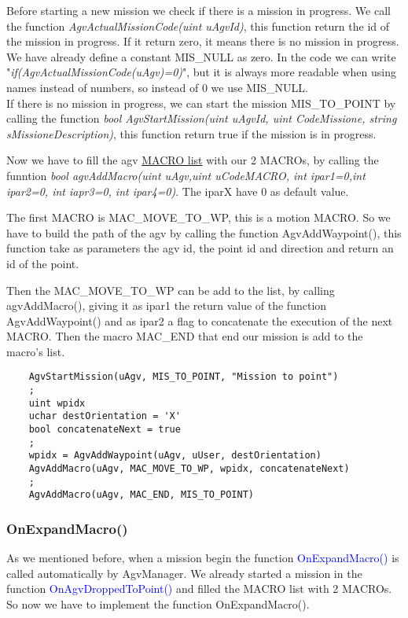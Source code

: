 Before starting a new mission we check if there is a mission in progress.
We call the function \textit{AgvActualMissionCode(uint uAgvId)}, this function return the id of the mission in progress.
If it return zero, it means there is no mission in progress. We have already define a constant MIS\_NULL as zero.
In the code we can write "\textit{if(AgvActualMissionCode(uAgv)=0)}", but it is always more readable when using names instead of numbers, so instead of 0 we use MIS\_NULL.\\

If there is no mission in progress, we can start the mission MIS\_TO\_POINT by calling the function \textit{bool AgvStartMission(uint uAgvId, uint CodeMissione, string sMissioneDescription)}, this function return true if the mission is in progress.

Now we have to fill the agv \underline{MACRO list} with our 2 MACROs, by calling the funntion \textit{bool agvAddMacro(uint uAgv,uint uCodeMACRO, int ipar1=0,int ipar2=0, int iapr3=0, int ipar4=0)}. The iparX have 0 as default value.

The first MACRO is MAC\_MOVE\_TO\_WP, this is a motion MACRO. So we have to build the path of the agv by calling the function AgvAddWaypoint(), this function take as parameters the agv id, the point id and direction and return an id of the point.

Then the MAC\_MOVE\_TO\_WP can be add to the list, by calling agvAddMacro(), giving it as ipar1 the return value of the function AgvAddWaypoint() and as ipar2 a flag to concatenate the execution of the next MACRO.
Then the macro MAC\_END that end our mission is add to the macro's list.

\begin{lstlisting}
	AgvStartMission(uAgv, MIS_TO_POINT, "Mission to point")
	;
	uint wpidx
	uchar destOrientation = 'X'
	bool concatenateNext = true
	;
	wpidx = AgvAddWaypoint(uAgv, uUser, destOrientation)
	AgvAddMacro(uAgv, MAC_MOVE_TO_WP, wpidx, concatenateNext)
	;
	AgvAddMacro(uAgv, MAC_END, MIS_TO_POINT)
\end{lstlisting}	




\subsubsection{OnExpandMacro()}
As we mentioned before, when a mission begin the function \textcolor{blue}{OnExpandMacro()} is called automatically by AgvManager. We already started a mission in the function  \textcolor{blue}{OnAgvDroppedToPoint()} and filled the MACRO list with 2 MACROs. So now we have to implement the function OnExpandMacro().

